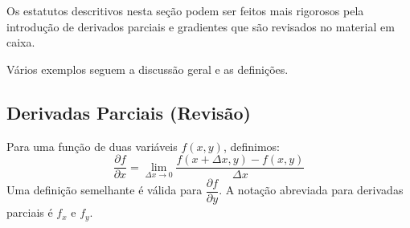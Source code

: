Os estatutos descritivos nesta seção podem ser feitos mais rigorosos pela introdução de derivados parciais e gradientes que são revisados no material em caixa.

Vários exemplos seguem a discussão geral e as definições.

\subsection{Derivadas Parciais (Revisão)}

Para uma função de duas variáveis $f(x,y)$, definimos:
\begin{equation}\label{eq:09.05}
\dfrac{\partial f}{\partial x} = \lim_{\Delta x \to 0} \dfrac{f(x+\Delta x, y) - f(x,y)}{\Delta x}
\end{equation}
Uma definição semelhante é válida para $\dfrac{\partial f}{\partial y}$. A notação abreviada para derivadas parciais é $f_x$ e $f_y$.


